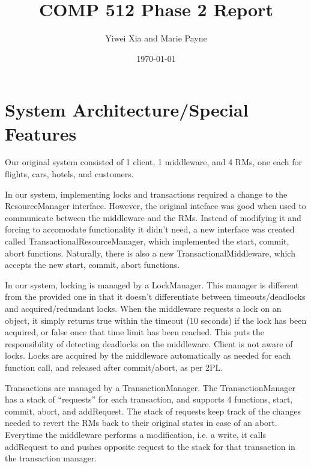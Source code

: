 \documentclass[letterpaper,12pt]{article}
\begin{document}
\title{COMP 512 Phase 2 Report}
\author{Yiwei Xia and Marie Payne}
\date{\today}
\maketitle

\pagebreak

\section{System Architecture/Special Features}

Our original system consisted of 1 client, 1 middleware, and 4 RMs, one each for flights, cars, hotels, and customers.

In our system, implementing locks and transactions required a change to the ResourceManager interface. However, the original inteface was good when used to communicate between the middleware and the RMs. Instead of modifying it and forcing to accomodate functionality it didn't need, a new interface was created called TransactionalResourceManager, which implemented the start, commit, abort functions. Naturally, there is also a new TransactionalMiddleware, which accepts the new start, commit, abort functions.

In our system, locking is managed by a LockManager. This manager is different from the provided one in that it doesn't differentiate between timeouts/deadlocks and acquired/redundant locks. When the middleware requests a lock on an object, it simply returns true within the timeout (10 seconds) if the lock has been acquired, or false once that time limit has been reached. This puts the responsibility of detecting deadlocks on the middleware. Client is not aware of locks. Locks are acquired by the middleware automatically as needed for each function call, and released after commit/abort, as per 2PL.

Transactions are managed by a TransactionManager. The TransactionManager has a stack of ``requests'' for each transaction, and supports 4 functions, start, commit, abort, and addRequest. The stack of requests keep track of the changes needed to revert the RMs back to their original states in case of an abort. Everytime the middleware performs a modification, i.e. a write, it calls addRequest to and pushes opposite request to the stack for that transaction in the transaction manager. 
\end{document}
